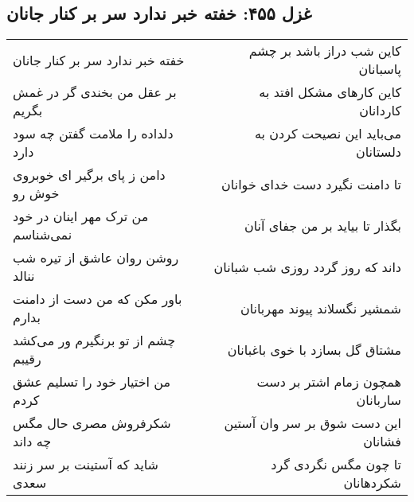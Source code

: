 \begin{center}
\section*{غزل ۴۵۵: خفته خبر ندارد سر بر کنار جانان}
\label{sec:455}
\begin{longtable}{l p{0.5cm} r}
خفته خبر ندارد سر بر کنار جانان
&&
کاین شب دراز باشد بر چشم پاسبانان
\\
بر عقل من بخندی گر در غمش بگریم
&&
کاین کارهای مشکل افتد به کاردانان
\\
دلداده را ملامت گفتن چه سود دارد
&&
می‌باید این نصیحت کردن به دلستانان
\\
دامن ز پای برگیر ای خوبروی خوش رو
&&
تا دامنت نگیرد دست خدای خوانان
\\
من ترک مهر اینان در خود نمی‌شناسم
&&
بگذار تا بیاید بر من جفای آنان
\\
روشن روان عاشق از تیره شب ننالد
&&
داند که روز گردد روزی شب شبانان
\\
باور مکن که من دست از دامنت بدارم
&&
شمشیر نگسلاند پیوند مهربانان
\\
چشم از تو برنگیرم ور می‌کشد رقیبم
&&
مشتاق گل بسازد با خوی باغبانان
\\
من اختیار خود را تسلیم عشق کردم
&&
همچون زمام اشتر بر دست ساربانان
\\
شکرفروش مصری حال مگس چه داند
&&
این دست شوق بر سر وان آستین فشانان
\\
شاید که آستینت بر سر زنند سعدی
&&
تا چون مگس نگردی گرد شکردهانان
\\
\end{longtable}
\end{center}
